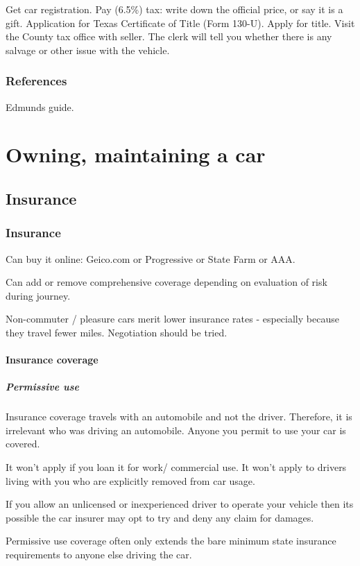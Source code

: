 \documentclass[oneside, article]{memoir}
\begin{document}
Get car registration. Pay (6.5\%) tax: write down the official price, or say it is a gift. Application for Texas Certificate of Title (Form 130-U). Apply for title. Visit the County tax office with seller. The clerk will tell you whether there is any salvage or other issue with the vehicle.

\section{References}
Edmunds guide.

\part{Owning, maintaining a car}
\chapter{Insurance}
\section{Insurance}
Can buy it online: Geico.com or Progressive or State Farm or AAA.

Can add or remove comprehensive coverage depending on evaluation of risk during journey.

Non-commuter / pleasure cars merit lower insurance rates - especially because they travel fewer miles. Negotiation should be tried.

\subsection{Insurance coverage}
\subsubsection{Permissive use}
Insurance coverage travels with an automobile and not the driver. Therefore, it is irrelevant who was driving an automobile. Anyone you permit to use your car is covered.

It won't apply if you loan it for work/ commercial use. It won't apply to drivers living with you who are explicitly removed from car usage.

If you allow an unlicensed or inexperienced driver to operate your vehicle then its possible the car insurer may opt to try and deny any claim for damages. 

Permissive use coverage often only extends the bare minimum state insurance requirements to anyone else driving the car.
\end{document}
